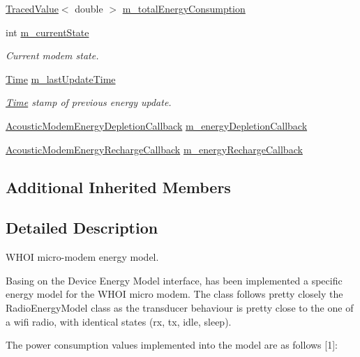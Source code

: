 \begin{DoxyCompactItemize}
\hyperlink{classns3_1_1TracedValue}{Traced\+Value}$<$ double $>$ \hyperlink{classns3_1_1AcousticModemEnergyModel_a435aaa2f2bfec309d87b476c4f17b647}{m\+\_\+total\+Energy\+Consumption}
\item 
int \hyperlink{classns3_1_1AcousticModemEnergyModel_a7fa8d6ead4a746d2afac40f060921af0}{m\+\_\+current\+State}
\begin{DoxyCompactList}\small\item\em Current modem state. \end{DoxyCompactList}\item 
\hyperlink{classns3_1_1Time}{Time} \hyperlink{classns3_1_1AcousticModemEnergyModel_a2f87b6c71b37c55d369b0fffc8818765}{m\+\_\+last\+Update\+Time}
\begin{DoxyCompactList}\small\item\em \hyperlink{classns3_1_1Time}{Time} stamp of previous energy update. \end{DoxyCompactList}\item 
\hyperlink{classns3_1_1AcousticModemEnergyModel_a04ad0c4c5ea21dc8d221761b734c317b}{Acoustic\+Modem\+Energy\+Depletion\+Callback} \hyperlink{classns3_1_1AcousticModemEnergyModel_a99efd3520dc70840e891568dfbf59f5a}{m\+\_\+energy\+Depletion\+Callback}
\item 
\hyperlink{classns3_1_1AcousticModemEnergyModel_a54a60baedb4014f67531e44ce079f1b1}{Acoustic\+Modem\+Energy\+Recharge\+Callback} \hyperlink{classns3_1_1AcousticModemEnergyModel_ade41911b745597921297b9be5b0eba8d}{m\+\_\+energy\+Recharge\+Callback}
\end{DoxyCompactItemize}
\subsection*{Additional Inherited Members}


\subsection{Detailed Description}
W\+H\+OI micro-\/modem energy model.

Basing on the Device Energy Model interface, has been implemented a specific energy model for the W\+H\+OI micro modem. The class follows pretty closely the Radio\+Energy\+Model class as the transducer behaviour is pretty close to the one of a wifi radio, with identical states (rx, tx, idle, sleep).

The power consumption values implemented into the model are as follows \mbox{[}1\mbox{]}\+:

